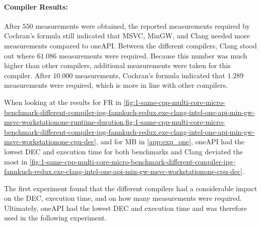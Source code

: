 
% 

\paragraph{Compiler Results:} After $550$ measurements were obtained, the reported measurements required by Cochran's formula still indicated that MSVC, MinGW, and Clang needed more measurements compared to oneAPI. Between the different compilers, Clang stood out where $61.086$ measurements were required. Because this number was much higher than other compilers, additional measurements were taken for this compiler. After $10.000$ measurements, Cochran's formula indicated that $1.289$ measurements were required, which is more in line with other compilers.


When looking at the results for FR in \cref{fig:1-same-cpp-multi-core-micro-benchmark-different-compiler-ipg-fannkuch-redux.exe-clang-intel-one-api-min-gw-msvc-workstationone-runtime-duration,fig:1-same-cpp-multi-core-micro-benchmark-different-compiler-ipg-fannkuch-redux.exe-clang-intel-one-api-min-gw-msvc-workstationone-cpu-dec}, and for MB in \cref{app:exp_one}, oneAPI had the lowest DEC and execution time for both benchmarks and Clang deviated the most in \cref{fig:1-same-cpp-multi-core-micro-benchmark-different-compiler-ipg-fannkuch-redux.exe-clang-intel-one-api-min-gw-msvc-workstationone-cpu-dec}.

The first experiment found that the different compilers had a considerable impact on the DEC, execution time, and on how many measurements were required. Ultimately, oneAPI had the lowest DEC and execution time and was therefore used in the following experiment.

